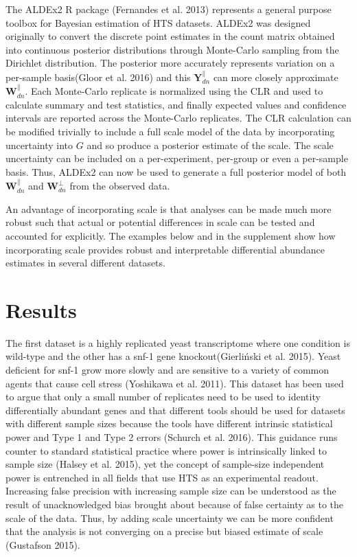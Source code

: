 \documentclass[
]{article}
\begin{document}
The ALDEx2 R package (Fernandes et al. 2013) represents a general
purpose toolbox for Bayesian estimation of HTS datasets. ALDEx2 was
designed originally to convert the discrete point estimates in the count
matrix obtained into continuous posterior distributions through
Monte-Carlo sampling from the Dirichlet distribution. The posterior more
accurately represents variation on a per-sample basis(Gloor et al. 2016)
and this \(\mathbf{Y}^{\parallel}_{dn}\) can more closely approximate
\(\mathbf{W}^{\parallel}_{dn}\). Each Monte-Carlo replicate is
normalized using the CLR and used to calculate summary and test
statistics, and finally expected values and confidence intervals are
reported across the Monte-Carlo replicates. The CLR calculation can be
modified trivially to include a full scale model of the data by
incorporating uncertainty into \(G\) and so produce a posterior estimate
of the scale. The scale uncertainty can be included on a per-experiment,
per-group or even a per-sample basis. Thus, ALDEx2 can now be used to
generate a full posterior model of both \(\mathbf{W}^{\parallel}_{dn}\)
and \(\mathbf{W}^{\perp}_{dn}\) from the observed data.

An advantage of incorporating scale is that analyses can be made much
more robust such that actual or potential differences in scale can be
tested and accounted for explicitly. The examples below and in the
supplement show how incorporating scale provides robust and
interpretable differential abundance estimates in several different
datasets.

\hypertarget{results}{%
\section{Results}\label{results}}

The first dataset is a highly replicated yeast transcriptome where one
condition is wild-type and the other has a snf-1 gene
knockout(Gierliński et al. 2015). Yeast deficient for snf-1 grow more
slowly and are sensitive to a variety of common agents that cause cell
stress (Yoshikawa et al. 2011). This dataset has been used to argue that
only a small number of replicates need to be used to identity
differentially abundant genes and that different tools should be used
for datasets with different sample sizes because the tools have
different intrinsic statistical power and Type 1 and Type 2 errors
(Schurch et al. 2016). This guidance runs counter to standard
statistical practice where power is intrinsically linked to sample size
(Halsey et al. 2015), yet the concept of sample-size independent power
is entrenched in all fields that use HTS as an experimental readout.
Increasing false precision with increasing sample size can be understood
as the result of unacknowledged bias brought about because of false
certainty as to the scale of the data. Thus, by adding scale uncertainty
we can be more confident that the analysis is not converging on a
precise but biased estimate of scale (Gustafson 2015).
\end{document}
